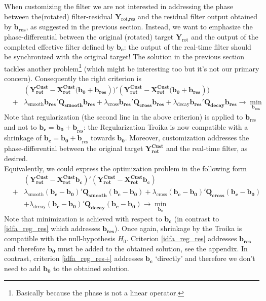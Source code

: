 \documentclass[11pt]{article}
\begin{document}
When customizing the filter we are not interested in addressing the phase between the(rotated)  filter-residual $ \mathbf{Y}_{\textrm{rot,res}}$  and the residual filter output obtained by $\mathbf{b_{\textrm{res}}}$, as suggested in the previous section. Instead, we want to emphasize 
the phase-differential between the original (rotated) target $ \mathbf{Y}_{\textrm{rot}}$ and the output of the completed effective filter defined by $\mathbf{b_{c}}$: the output of the real-time filter should be synchronized with the original target! The solution in the previous section tackles another problem\footnote{Basically because the phase is not a linear operator.} (which might be interesting too but it's not our primary concern). Consequently the right criterion is
\begin{eqnarray}\label{idfa_reg_res}
&&(\mathbf{Y_{\textrm{rot}}^{\textrm{Cust}}-X_{\textrm{rot}}^{\textrm{Cust}}(b_0+b_{\textrm{res}}}))'(\mathbf{Y_{\textrm{rot}}^{\textrm{Cust}}-X_{\textrm{rot}}^{\textrm{Cust}}(b_0+b_{\textrm{res}}}))\nonumber\\
&+&\lambda_{\textrm{smooth}}\mathbf{b_{\textrm{res}}'Q_{smooth}b_{\textrm{res}}}
+\lambda_{\textrm{cross}}\mathbf{b_{\textrm{res}}'Q_{cross}b_{\textrm{res}}}+
\lambda_{\textrm{decay}}\mathbf{b_{\textrm{res}}'Q_{decay}b_{\textrm{res}}}\to\min_{\mathbf{b}_{\textbf{res}}}
\end{eqnarray}
Note that regularization (the second line in the above criterion) is applied to $\mathbf{b}_{\textrm{res}}$ and not to $\mathbf{b_c}=\mathbf{b_0+b}_{\textrm{res}}$: the Regularization Troika is now compatible with a shrinkage of $\mathbf{b_c}=\mathbf{b_0+b}_{\textrm{res}}$ towards $\mathbf{b_{0}}$. Moreover, customization addresses the phase-differential 
between the original target $\mathbf{Y_{\textrm{rot}}^{\textrm{Cust}}}$ and the real-time filter, as desired.\\

Equivalently, we could express the optimization problem in the following form
\begin{eqnarray}\label{idfa_reg_res+}
&&(\mathbf{Y_{\textrm{rot}}^{\textrm{Cust}}-X_{\textrm{rot}}^{\textrm{Cust}}b_c})'(\mathbf{Y_{\textrm{rot}}^{\textrm{Cust}}-X_{\textrm{rot}}^{\textrm{Cust}}b_c})\nonumber\\
&+&\lambda_{\textrm{smooth}}\mathbf{(b_c-b_0)'Q_{smooth}(b_c-b_0)}
+\lambda_{\textrm{cross}}\mathbf{(b_c-b_0)'Q_{cross}(b_c-b_0)}\nonumber\\
&&+\lambda_{\textrm{decay}}\mathbf{(b_c-b_0)'Q_{decay}(b_c-b_0)}\to\min_{\mathbf{b_c}}
\end{eqnarray}
Note that minimization is achieved with respect to $\mathbf{b_c}$ (in contrast to \ref{idfa_reg_res} which addresses $\mathbf{b}_{\textbf{res}}$). Once again, shrinkage by the Troika is compatible with the null-hypothesis $H_0$. Criterion \ref{idfa_reg_res} addresses $\mathbf{b}_{\textbf{res}}$ and therefore $\mathbf{b_0}$ must be added to the obtained solution, see 
the appendix. In contrast, criterion \ref{idfa_reg_res+} addresses $\mathbf{b_c}$ `directly' and therefore we don't need to add $\mathbf{b_0}$ to the obtained solution.\\
\end{document}
